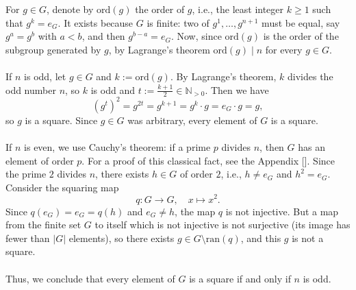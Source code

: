\begin{solution}
    For \( g \in G \), denote by \( \mathrm{ord}\left(g\right) \) the order of \( g \), i.e., the least integer \( k \geq 1 \) such that \( g^{k} = e_G \). It exists because \( G \) is finite: two of \( g^{1}, \dots, g^{n+1} \) must be equal, say \( g^{a} = g^{b} \) with \( a < b \), and then \( g^{b-a} = e_G \). Now, since \( \mathrm{ord}\left(g\right) \) is the order of the subgroup generated by \( g \), by Lagrange's theorem \( \mathrm{ord}\left(g\right) \mid n \) for every \( g \in G \).
    \\\\
    If \( n \) is odd, let \( g \in G \) and \( k := \mathrm{ord}\left(g\right) \). By Lagrange's theorem, \( k \) divides the odd number \( n \), so \( k \) is odd and \( t := \frac{k+1}{2} \in \mathbb{N}_{>0} \). Then we have
    \[
        \left( g^{t} \right)^{2} = g^{2t} = g^{k+1} = g^{k} \cdot g = e_G \cdot g = g,
    \]
    so \( g \) is a square. Since \( g \in G \) was arbitrary, every element of \( G \) is a square.
    \\\\
    If \( n \) is even, we use Cauchy's theorem: if a prime \( p \) divides \( n \), then \( G \) has an element of order \( p \). For a proof of this classical fact, see the Appendix []. Since the prime \( 2 \) divides \( n \), there exists \( h \in G \) of order \( 2 \), i.e., \( h \neq e_G \) and \( h^{2} = e_G \). Consider the squaring map
    \[
        q \colon G \to G, \quad x \mapsto x^{2}.
    \]
    Since \( q\left(e_G\right) = e_G = q\left(h\right) \) and \( e_G \neq h \), the map \( q \) is not injective. But a map from the finite set \( G \) to itself which is not injective is not surjective (its image has fewer than \( \left| G \right| \) elements), so there exists \( g \in G \setminus \mathrm{ran}\left(q\right) \), and this \( g \) is not a square.
    \\\\
    Thus, we conclude that every element of \( G \) is a square if and only if \( n \) is odd.
\end{solution}
